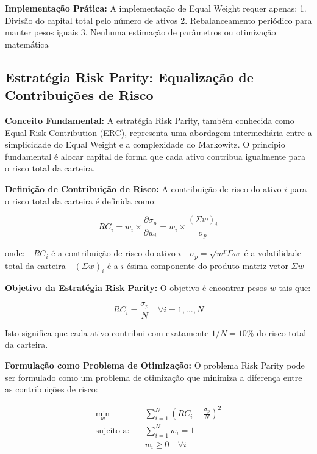 \textbf{Implementação Prática:} A implementação de Equal Weight requer apenas:
1. Divisão do capital total pelo número de ativos
2. Rebalanceamento periódico para manter pesos iguais
3. Nenhuma estimação de parâmetros ou otimização matemática

\subsection{Estratégia Risk Parity: Equalização de Contribuições de Risco}

\textbf{Conceito Fundamental:} A estratégia Risk Parity, também conhecida como Equal Risk Contribution (ERC), representa uma abordagem intermediária entre a simplicidade do Equal Weight e a complexidade do Markowitz. O princípio fundamental é alocar capital de forma que cada ativo contribua igualmente para o risco total da carteira.

\textbf{Definição de Contribuição de Risco:} A contribuição de risco do ativo $i$ para o risco total da carteira é definida como:

\begin{equation}
RC_i = w_i \times \frac{\partial \sigma_p}{\partial w_i} = w_i \times \frac{(\Sigma w)_i}{\sigma_p}
\end{equation}

onde:
- $RC_i$ é a contribuição de risco do ativo $i$
- $\sigma_p = \sqrt{w^T \Sigma w}$ é a volatilidade total da carteira
- $(\Sigma w)_i$ é a $i$-ésima componente do produto matriz-vetor $\Sigma w$

\textbf{Objetivo da Estratégia Risk Parity:} O objetivo é encontrar pesos $w$ tais que:

\begin{equation}
RC_i = \frac{\sigma_p}{N} \quad \forall i = 1, ..., N
\end{equation}

Isto significa que cada ativo contribui com exatamente $1/N = 10\%$ do risco total da carteira.

\textbf{Formulação como Problema de Otimização:} O problema Risk Parity pode ser formulado como um problema de otimização que minimiza a diferença entre as contribuições de risco:

\begin{align}
\min_{w} \quad & \sum_{i=1}^{N} \left(RC_i - \frac{\sigma_p}{N}\right)^2 \\
\text{sujeito a:} \quad & \sum_{i=1}^{N} w_i = 1 \\
& w_i \geq 0 \quad \forall i
\end{align}

